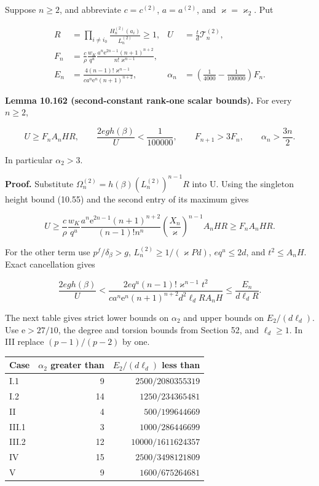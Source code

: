 \documentclass[
  11pt,
  a4paper,
]{article}
\newcounter{none} %
\begin{document}
Suppose \(n\ge2\), and abbreviate \(c=c^{(2)}\), \(a=a^{(2)}\), and
\(\varkappa=\varkappa_2\). Put

\[
\begin{aligned}
R&=\prod_{i\ne i_0}\frac{H_n^{(2)}(a_i)}{L_n^{(2)}}\ge1,
&U&=\frac t d\mathcal T_n^{(2)},\\
F_n&=\frac c\rho\frac{w_K}{q^u}
\frac{a^n\mathrm e^{2n-1}(n+1)^{n+2}}
{n!\varkappa^{n-1}},\\
E_n&=\frac{4(n-1)!\varkappa^{n-1}}
{ca^n\mathrm e^n(n+1)^{n+2}},
&\alpha_n&=\left(\frac1{4000}-\frac1{100000}\right)F_n.
\end{aligned}
\tag{10.528}
\]

\textbf{Lemma 10.162 (second-constant rank-one scalar bounds).} For
every \(n\ge2\),

\[
U\ge F_nA_nHR,\qquad
\frac{2eg h(\beta)}U<\frac1{100000},\qquad
F_{n+1}>3F_n,\qquad \alpha_n>\frac{3n}{2}.
\tag{10.529}
\]

In particular \(\alpha_2>3\).

\textbf{Proof.} Substitute \(\Omega_n^{(2)}=h(\beta)(L_n^{(2)})^{n-1}R\)
into U. Using the singleton height bound (10.55) and the second entry of
its maximum gives

\[
U\ge\frac c\rho\frac{w_K}{q^u}
\frac{a^n\mathrm e^{2n-1}(n+1)^{n+2}}
{(n-1)!n^n}
\left(\frac{X_n}{\varkappa}\right)^{n-1}A_nHR
\ge F_nA_nHR.
\tag{10.530}
\]

For the other term use \(p^f/\delta_\beta>g\),
\(L_n^{(2)}\ge1/(\varkappa Pd)\), \(eq^u\le2d\), and \(t^2\le A_nH\).
Exact cancellation gives

\[
\frac{2eg h(\beta)}U
<\frac{2eq^u(n-1)!\varkappa^{n-1}t^2}
{ca^n\mathrm e^n(n+1)^{n+2}d^2\ell_dRA_nH}
\le\frac{E_n}{d\ell_dR}.
\tag{10.531}
\]

The next table gives strict lower bounds on \(\alpha_2\) and upper
bounds on \(E_2/(d\ell_d)\). Use \(\mathrm e>27/10\), the degree and
torsion bounds from Section 52, and \(\ell_d\ge1\). In III replace
\((p-1)/(p-2)\) by one.

{\def\LTcaptype{none} %
\begin{longtable}[]{@{}lrr@{}}
\toprule\noalign{}
Case & \(\alpha_2\) greater than & \(E_2/(d\ell_d)\) less than \\
\midrule\noalign{}
\endhead
\bottomrule\noalign{}
\endlastfoot
I.1 & 9 & \(2500/2080355319\) \\
I.2 & 14 & \(1250/234365481\) \\
II & 4 & \(500/199644669\) \\
III.1 & 3 & \(1000/286446699\) \\
III.2 & 12 & \(10000/1611624357\) \\
IV & 15 & \(2500/3498121809\) \\
V & 9 & \(1600/675264681\) \\
\end{longtable}
}
\end{document}
